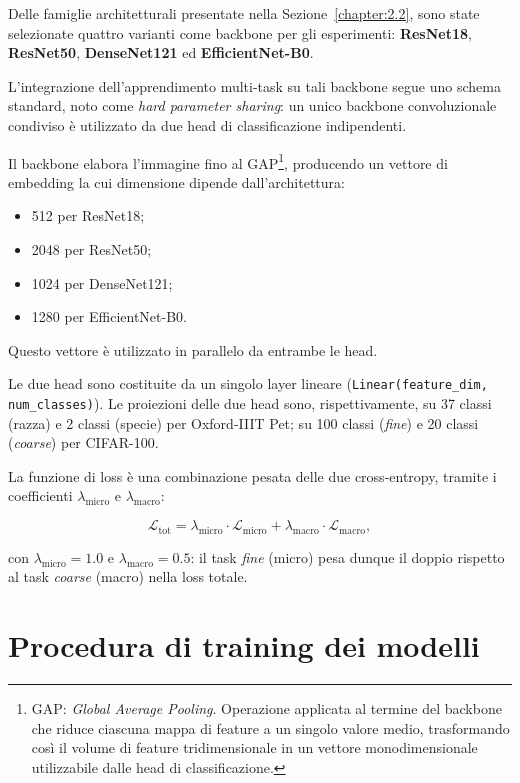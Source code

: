 Delle famiglie architetturali presentate nella Sezione~\ref{chapter:2.2}, sono state selezionate quattro varianti come backbone per gli esperimenti: \textbf{ResNet18}, \textbf{ResNet50}, \textbf{DenseNet121} ed \textbf{EfficientNet-B0}.

L'integrazione dell'apprendimento multi-task su tali backbone segue uno schema standard, noto come \emph{hard parameter sharing}: un unico backbone convoluzionale condiviso è utilizzato da due head di classificazione indipendenti.

Il backbone elabora l'immagine fino al GAP\footnote{GAP: \emph{Global Average Pooling}. Operazione applicata al termine del backbone che riduce ciascuna mappa di feature a un singolo valore medio, trasformando così il volume di feature tridimensionale in un vettore monodimensionale utilizzabile dalle head di classificazione.}, producendo un vettore di embedding la cui dimensione dipende dall'architettura:

\begin{itemize}
	\item 512 per ResNet18;
	\item 2048 per ResNet50;
	\item 1024 per DenseNet121;
	\item 1280 per EfficientNet-B0.
\end{itemize}

Questo vettore è utilizzato in parallelo da entrambe le head.

Le due head sono costituite da un singolo layer lineare (\texttt{Linear(feature\_dim, num\_classes)}). Le proiezioni delle due head sono, rispettivamente, su 37 classi (razza) e 2 classi (specie) per Oxford-IIIT Pet; su 100 classi (\emph{fine}) e 20 classi (\emph{coarse}) per CIFAR-100.

La funzione di loss è una combinazione pesata delle due cross-entropy, tramite i coefficienti $\lambda_{\text{micro}}$ e $\lambda_{\text{macro}}$:

\begin{equation}
	\mathcal{L}_{\text{tot}} = \lambda_{\text{micro}} \cdot \mathcal{L}_{\text{micro}} + \lambda_{\text{macro}} \cdot \mathcal{L}_{\text{macro}},
\end{equation}

con $\lambda_{\text{micro}} = 1.0$ e $\lambda_{\text{macro}} = 0.5$: il task \emph{fine} (micro) pesa dunque il doppio rispetto al task \emph{coarse} (macro) nella loss totale.

\section{Procedura di training dei modelli}
\label{sec:procedura-training}

